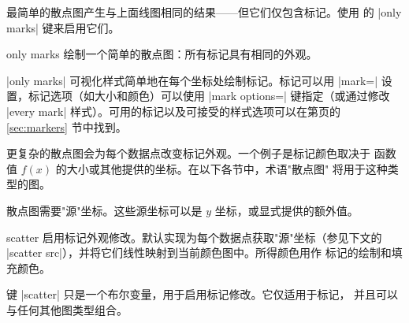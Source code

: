 {最简单的散点图产生与上面线图相同的结果——但它们仅包含标记。使用
\Tikz{} 的 |only marks| 键来启用它们。

\begin{plottype}{only marks}
    绘制一个简单的散点图：所有标记具有相同的外观。
\begin{codeexample}[]
\end{codeexample}
    |only marks| 可视化样式简单地在每个坐标处绘制标记。标记可以用
    |mark=| 设置，标记选项（如大小和颜色）可以使用
    |mark options=| 键指定（或通过修改 |every mark|
    样式）。可用的标记以及可接受的样式选项可以在第\pageref{sec:markers}页的
    \ref{sec:markers} 节中找到。
\end{plottype}

    \label{pgfplots:scatter}
更复杂的散点图会为每个数据点改变标记外观。一个例子是标记颜色取决于
函数值 $f(x)$ 的大小或其他提供的坐标。在以下各节中，术语"散点图"
将用于这种类型的图。

散点图需要"源"坐标。这些源坐标可以是 $y$ 坐标，或显式提供的额外值。

\begin{plottype}[/pgfplots]{scatter}
    启用标记外观修改。默认实现为每个数据点获取"源"坐标（参见下文的
    |scatter src|），并将它们线性映射到当前颜色图中。所得颜色用作
    标记的绘制和填充颜色。

\begin{codeexample}[]
\end{codeexample}

    键 |scatter| 只是一个布尔变量，用于启用标记修改。它仅适用于标记，
    并且可以与任何其他图类型组合。

\begin{codeexample}[]
\end{codeexample}
\end{plottype}

}
